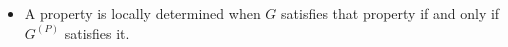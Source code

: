 \documentclass[preview]{standalone}
\begin{document}
\begin{center}
\begin{itemize} \item A property is locally determined when $G$ satisfies that property if and only if $G^{(P)}$ satisfies it.\end{itemize}
\end{center}
\end{document}
